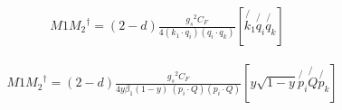 \begin{equation}
\begin{split}
M1{M_2}^{\dagger}=(2-d)\frac{{g_s}^2 C_F}{4(k_1 \cdot q_i)(q_i \cdot q_k)}[\not{k_1} \not{q_i} \not{q_k}]
\end{split}
\end{equation}

\begin{equation}
\begin{split}
&M1{M_2}^{\dagger}=(2-d)\frac{{g_s}^2 C_F}{4y\beta_1 (1-y)\:(p_i \cdot Q)(p_i \cdot Q)}[ y\sqrt{1-y} \not{p_i} \not{Q}\not{p_k}]
\end{split}
\end{equation}